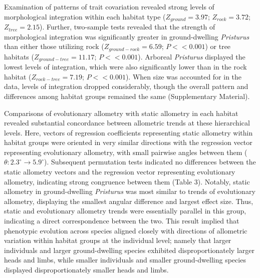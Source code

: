 \documentclass[
  11pt,
]{article}
\begin{document}
Examination of patterns of trait covariation revealed strong levels of
morphological integration within each habitat type (\(Z_{ground}=3.97\);
\(Z_{rock}=3.72\); \(Z_{tree}=2.15\)). Further, two-sample tests
revealed that the strength of morphological integration was
significantly greater in ground-dwelling \emph{Pristurus} than either
those utilizing rock (\(Z_{ground-rock}=6.59\); \(P << 0.001\)) or tree
habitats (\(Z_{ground-tree}=11.17\); \(P << 0.001\)). Arboreal
\emph{Pristurus} displayed the lowest levels of integration, which were
also significantly lower than in the rock habitat
(\(Z_{rock-tree}=7.19\); \(P << 0.001\)). When size was accounted for in
the data, levels of integration dropped considerably, though the overall
pattern and differences among habitat groups remained the same
(Supplementary Material). \hfill\break

Comparisons of evolutionary allometry with static allometry in each
habitat revealed substantial concordance between allometric trends at
these hierarchical levels. Here, vectors of regression coefficients
representing static allometry within habitat groups were oriented in
very similar directions with the regression vector representing
evolutionary allometry, with small pairwise angles between them
(\(\theta: 2.3^\circ\rightarrow5.9^\circ\)). Subsequent permutation
tests indicated no differences between the static allometry vectors and
the regression vector representing evolutionary allometry, indicating
strong congruence between them (Table 3). Notably, static allometry in
ground-dwelling \emph{Pristurus} was most similar to trends of
evolutionary allometry, displaying the smallest angular difference and
largest effect size. Thus, static and evolutionary allometry trends were
essentially parallel in this group, indicating a direct correspondence
between the two. This result implied that phenotypic evolution across
species aligned closely with directions of allometric variation within
habitat groups at the individual level; namely that larger individuals
and larger ground-dwelling species exhibited disproportionately larger
heads and limbs, while smaller individuals and smaller ground-dwelling
species displayed disproportionately smaller heads and limbs.
\hfill\break
\end{document}
